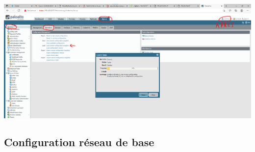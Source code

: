 \documentclass[a4paper]{article}
\begin{document}
\begin{center} \includegraphics[width=0.99\linewidth]{images/load-config.png} \end{center}










\newpage \subsection{Configuration réseau de base}
\end{document}
